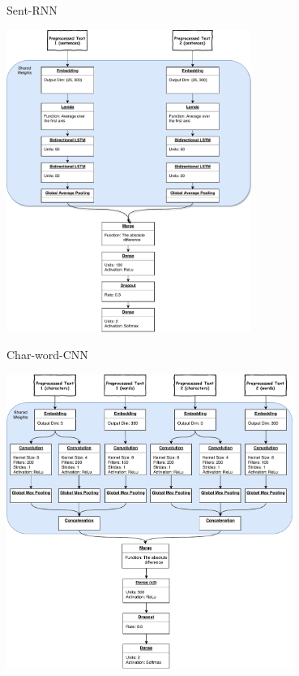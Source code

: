 \documentclass[10pt]{beamer}
\begin{document}
\begin{frame}[fragile]{Sent-RNN}
    \begin{center}
        \includegraphics[width=0.6\textwidth]{../../report/pictures/experiments/rec_sent_nn/model}
    \end{center}
\end{frame}

\begin{frame}[fragile]{Char-word-CNN}
    \begin{center}
        \includegraphics[width=0.7\textwidth]{../../report/pictures/experiments/conv_char_word_nn/model}
    \end{center}
\end{frame}
\end{document}
